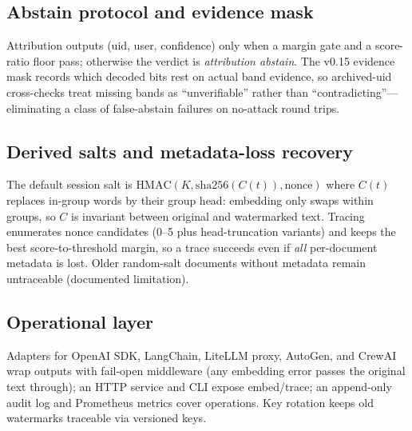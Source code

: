 \subsection{Abstain protocol and evidence mask}
Attribution outputs (uid, user, confidence) only when a margin gate and a
score-ratio floor pass; otherwise the verdict is \emph{attribution
abstain}. The v0.15 evidence mask records which decoded bits rest on actual
band evidence, so archived-uid cross-checks treat missing bands as
``unverifiable'' rather than ``contradicting''---eliminating a class of
false-abstain failures on no-attack round trips.

\subsection{Derived salts and metadata-loss recovery}
The default session salt is $\mathrm{HMAC}(K, \mathrm{sha256}(C(t)),
\mathrm{nonce})$ where $C(t)$ replaces in-group words by their group head:
embedding only swaps within groups, so $C$ is invariant between original
and watermarked text. Tracing enumerates nonce candidates (0--5 plus
head-truncation variants) and keeps the best score-to-threshold margin,
so a trace succeeds even if \emph{all} per-document metadata is lost. Older
random-salt documents without metadata remain untraceable (documented
limitation).

\subsection{Operational layer}
Adapters for OpenAI SDK, LangChain, LiteLLM proxy, AutoGen, and CrewAI
wrap outputs with fail-open middleware (any embedding error passes the
original text through); an HTTP service and CLI expose embed/trace; an
append-only audit log and Prometheus metrics cover operations. Key
rotation keeps old watermarks traceable via versioned keys.
